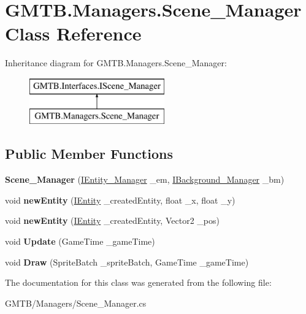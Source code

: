 \hypertarget{class_g_m_t_b_1_1_managers_1_1_scene___manager}{}\section{G\+M\+T\+B.\+Managers.\+Scene\+\_\+\+Manager Class Reference}
\label{class_g_m_t_b_1_1_managers_1_1_scene___manager}
Inheritance diagram for G\+M\+T\+B.\+Managers.\+Scene\+\_\+\+Manager\+:\begin{figure}[H]
\begin{center}
\leavevmode
\includegraphics[height=2.000000cm]{class_g_m_t_b_1_1_managers_1_1_scene___manager}
\end{center}
\end{figure}
\subsection*{Public Member Functions}
\begin{DoxyCompactItemize}
\item 
\mbox{\label{class_g_m_t_b_1_1_managers_1_1_scene___manager_a7eaf04761a3580b6b986693cb1afa6cb}} 
{\bfseries Scene\+\_\+\+Manager} (\mbox{\hyperlink{interface_g_m_t_b_1_1_interfaces_1_1_i_entity___manager}{I\+Entity\+\_\+\+Manager}} \+\_\+em, \mbox{\hyperlink{interface_g_m_t_b_1_1_interfaces_1_1_i_background___manager}{I\+Background\+\_\+\+Manager}} \+\_\+bm)
\item 
\mbox{\label{class_g_m_t_b_1_1_managers_1_1_scene___manager_a3d5dac928346c569f3631bf1df48c7a9}} 
void {\bfseries new\+Entity} (\mbox{\hyperlink{interface_g_m_t_b_1_1_interfaces_1_1_i_entity}{I\+Entity}} \+\_\+created\+Entity, float \+\_\+x, float \+\_\+y)
\item 
\mbox{\label{class_g_m_t_b_1_1_managers_1_1_scene___manager_a17507e617cb2a7f4261b3870f0322f4d}} 
void {\bfseries new\+Entity} (\mbox{\hyperlink{interface_g_m_t_b_1_1_interfaces_1_1_i_entity}{I\+Entity}} \+\_\+created\+Entity, Vector2 \+\_\+pos)
\item 
\mbox{\label{class_g_m_t_b_1_1_managers_1_1_scene___manager_aa1b8f7f0d6ebd394e56c42a2d7590d01}} 
void {\bfseries Update} (Game\+Time \+\_\+game\+Time)
\item 
\mbox{\label{class_g_m_t_b_1_1_managers_1_1_scene___manager_a2a0fa924410bd12b7488a799083d4250}} 
void {\bfseries Draw} (Sprite\+Batch \+\_\+sprite\+Batch, Game\+Time \+\_\+game\+Time)
\end{DoxyCompactItemize}


The documentation for this class was generated from the following file\+:\begin{DoxyCompactItemize}
\item 
G\+M\+T\+B/\+Managers/Scene\+\_\+\+Manager.\+cs\end{DoxyCompactItemize}
